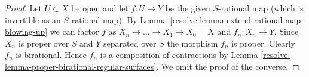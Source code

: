 \begin{proof}

Let $U \subset X$ be open and let $f : U \to Y$ be the given
$S$-rational map (which is invertible as an $S$-rational map).
By Lemma \ref{resolve-lemma-extend-rational-map-blowing-up}
we can factor $f$ as $X_n \to \ldots \to X_1 \to X_0 = X$
and $f_n : X_n \to Y$. Since $X_n$ is proper over $S$ and
$Y$ separated over $S$ the morphism $f_n$ is proper.
Clearly $f_n$ is birational. Hence $f_n$ is a composition
of contractions by Lemma \ref{resolve-lemma-proper-birational-regular-surfaces}.
We omit the proof of the converse.
\end{proof}



